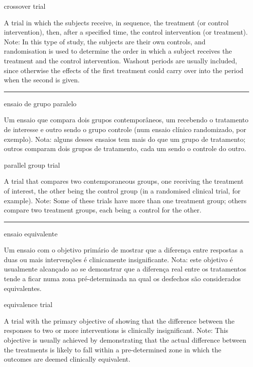 \documentclass[
  openany]{book}
\begin{document}
crossover trial

A trial in which the subjects receive, in sequence, the treatment (or control intervention), then, after a specified time, the control intervention (or treatment). Note: In this type of study, the subjects are their own controls, and randomisation is used to determine the order in which a subject receives the treatment and the control intervention. Washout periods are usually included, since otherwise the effects of the first treatment could carry over into the period when the second is given.

\begin{center}\rule{0.5\linewidth}{0.5pt}\end{center}

ensaio de grupo paralelo

Um ensaio que compara dois grupos contemporâneos, um recebendo o tratamento de interesse e outro sendo o grupo controle (num ensaio clínico randomizado, por exemplo). Nota: alguns desses ensaios tem mais do que um grupo de tratamento; outros comparam dois grupos de tratamento, cada um sendo o controle do outro.

parallel group trial

A trial that compares two contemporaneous groups, one receiving the treatment of interest, the other being the control group (in a randomised clinical trial, for example). Note: Some of these trials have more than one treatment group; others compare two treatment groups, each being a control for the other.

\begin{center}\rule{0.5\linewidth}{0.5pt}\end{center}

ensaio equivalente

Um ensaio com o objetivo primário de mostrar que a diferença entre respostas a duas ou mais intervenções é clinicamente insignificante. Nota: este objetivo é usualmente alcançado ao se demonstrar que a diferença real entre os tratamentos tende a ficar numa zona pré-determinada na qual os desfechos são considerados equivalentes.

equivalence trial

A trial with the primary objective of showing that the difference between the responses to two or more interventions is clinically insignificant. Note: This objective is usually achieved by demonstrating that the actual difference between the treatments is likely to fall within a pre-determined zone in which the outcomes are deemed clinically equivalent.
\end{document}
